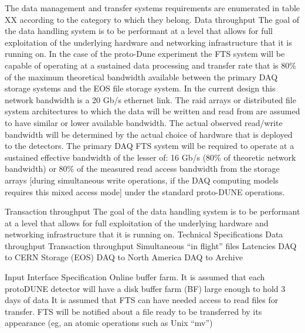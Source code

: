 
The data management and transfer systems requirements are enumerated in table XX according to the category to which they belong.
Data throughput
The goal of the data handling system is to be performant at a level that allows for full exploitation of the underlying hardware and networking infrastructure that it is running on.  In the case of the proto-Dune experiment the FTS system will be capable of operating at a sustained data processing and transfer rate that is 80\% of the maximum theoretical bandwidth available between the primary DAQ storage systems and the EOS file storage system.  In the current design this network bandwidth is a 20 Gb/s ethernet link.  The raid arrays or distributed file system architectures to which the data will be written and read from are assumed to have similar or lower available bandwidth.  The actual observed read/write bandwidth will be determined by the actual choice of hardware that is deployed to the detectors.  The primary DAQ FTS system will be required to operate at a sustained effective bandwidth of the lesser of: 16 Gb/s (80\% of theoretic network bandwidth) or 80\% of the measured read access bandwidth from the storage arrays [during simultaneous write operations, if the DAQ computing models requires this mixed access mode] under the standard proto-DUNE operations.

Transaction throughput
The goal of the data handling system is to be performant at a level that allows for full exploitation of the underlying hardware and networking infrastructure that it is running on. 
Technical Specifications
Data throughput
Transaction throughput
Simultaneous “in flight” files
Latencies
DAQ to CERN Storage (EOS)
DAQ to North America
DAQ to Archive

Input Interface Specification
Online buffer farm.
It is assumed that each protoDUNE detector will have a disk buffer farm (BF) large enough to hold 3 days of data
It is assumed that FTS can have needed access to read files for transfer.
FTS will be notified about a file ready to be transferred by its appearance (eg, an atomic operations such as Unix ``mv'')

